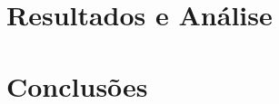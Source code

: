 \documentclass[twoside,a4paper,12pt]{report}
\begin{document}

%
\chapter{Resultados e Análise}
\chapter{Conclusões}


%

%

%

\end{document}
